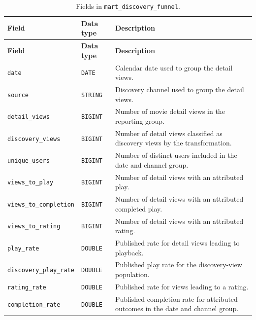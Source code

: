 \documentclass[a4paper,12pt]{article}
\newcommand{\dbsep}{\_\allowbreak}
\begin{document}
\begingroup
\small
\setlength{\tabcolsep}{4pt}
\renewcommand{\arraystretch}{1.1}
\begin{longtable}{@{}>{\raggedright\arraybackslash}p{}
                    >{\raggedright\arraybackslash}p{}
                    >{\raggedright\arraybackslash}p{}@{}}
\caption{Fields in \texttt{mart\dbsep discovery\dbsep funnel}.}\\
\toprule
\textbf{Field} & \textbf{Data type} & \textbf{Description}\\
\midrule
\endfirsthead
\toprule
\textbf{Field} & \textbf{Data type} & \textbf{Description}\\
\midrule
\endhead
\bottomrule
\endfoot
\texttt{date} & \texttt{DATE} & Calendar date used to group the detail views.\\
\texttt{source} & \texttt{STRING} & Discovery channel used to group the detail views.\\
\texttt{detail\dbsep views} & \texttt{BIGINT} & Number of movie detail views in the reporting group.\\
\texttt{discovery\dbsep views} & \texttt{BIGINT} & Number of detail views classified as discovery views by the transformation.\\
\texttt{unique\dbsep users} & \texttt{BIGINT} & Number of distinct users included in the date and channel group.\\
\texttt{views\dbsep to\dbsep play} & \texttt{BIGINT} & Number of detail views with an attributed play.\\
\texttt{views\dbsep to\dbsep completion} & \texttt{BIGINT} & Number of detail views with an attributed completed play.\\
\texttt{views\dbsep to\dbsep rating} & \texttt{BIGINT} & Number of detail views with an attributed rating.\\
\texttt{play\dbsep rate} & \texttt{DOUBLE} & Published rate for detail views leading to playback.\\
\texttt{discovery\dbsep play\dbsep rate} & \texttt{DOUBLE} & Published play rate for the discovery-view population.\\
\texttt{rating\dbsep rate} & \texttt{DOUBLE} & Published rate for views leading to a rating.\\
\texttt{completion\dbsep rate} & \texttt{DOUBLE} & Published completion rate for attributed outcomes in the date and channel group.\\
\end{longtable}
\endgroup
\end{document}
